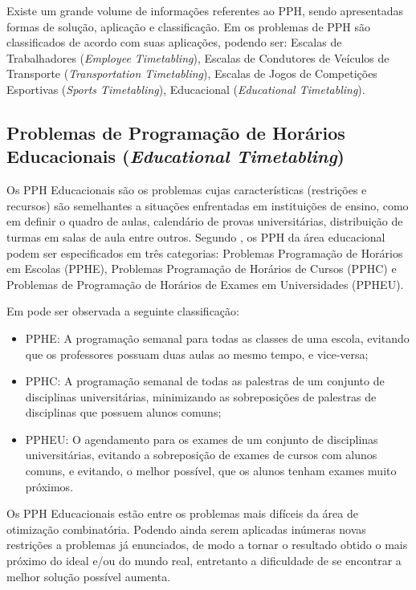 Existe um grande volume de informações referentes ao PPH, sendo apresentadas formas de solução, aplicação e classificação. Em  os problemas de PPH são classificados de acordo com suas aplicações, podendo ser: Escalas de Trabalhadores (\textit{Employee Timetabling}), Escalas de Condutores de Veículos de Transporte (\textit{Transportation Timetabling}), Escalas de Jogos de Competições Esportivas (\textit{Sports Timetabling}), Educacional (\textit{Educational Timetabling}).


\subsection{Problemas de Programação de Horários Educacionais (\textit{Educational Timetabling})}

Os PPH Educacionais são os problemas cujas características (restrições e recursos) são semelhantes a situações enfrentadas em instituições de ensino, como em definir o quadro de aulas, calendário de provas universitárias, distribuição de turmas em salas de aula entre outros. Segundo , os PPH da área educacional podem ser especificados em três categorias: Problemas Programação de Horários em Escolas (PPHE),  Problemas Programação de Horários de Cursos (PPHC) e Problemas de Programação de Horários de Exames em Universidades (PPHEU). 

Em  pode ser observada a seguinte classificação:

\begin{itemize}
\item PPHE: A programação semanal para todas as classes de uma escola, evitando que os professores possuam duas aulas ao mesmo tempo, e vice-versa;
\item PPHC: A programação semanal de todas as palestras de um conjunto de disciplinas universitárias, minimizando as sobreposições de palestras de disciplinas que possuem alunos comuns;
\item PPHEU: O agendamento para os exames de um conjunto de disciplinas universitárias, evitando a sobreposição de exames de cursos com alunos comuns, e evitando, o melhor possível, que os alunos tenham exames muito próximos.
\end{itemize}


Os PPH Educacionais estão entre os problemas mais difíceis da área de otimização combinatória. Podendo ainda serem aplicadas inúmeras novas restrições a problemas já enunciados, de modo a tornar o resultado obtido o mais próximo do ideal e/ou do mundo real, entretanto a dificuldade de se encontrar a melhor solução possível aumenta.

